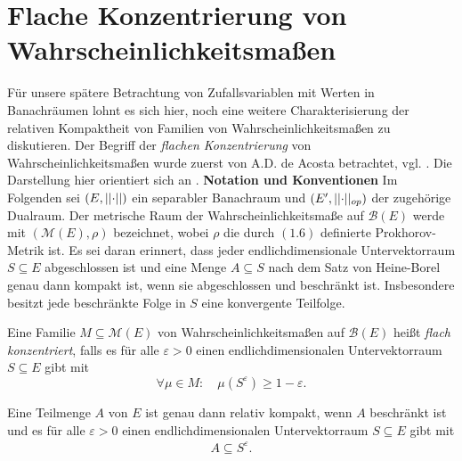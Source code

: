 \section{Flache Konzentrierung von Wahrscheinlichkeitsmaßen}
Für unsere spätere Betrachtung von Zufallsvariablen mit Werten in Banachräumen lohnt es sich hier, noch eine weitere Charakterisierung der relativen Kompaktheit von Familien von Wahrscheinlichkeitsmaßen zu diskutieren. 
Der Begriff der \textit{flachen Konzentrierung} von Wahrscheinlichkeitsmaßen wurde zuerst von A.D. de Acosta betrachtet, vgl. \cite{acosta}. 
Die Darstellung hier orientiert sich an \cite{vakhania}. 
\newline \textbf{Notation und Konventionen} \newline 
Im Folgenden sei $(E, \lvert\lvert \cdot \rvert\rvert)$ ein separabler Banachraum und $(E', \lvert\lvert \cdot \rvert\rvert_{op})$ der zugehörige Dualraum. Der metrische Raum der Wahrscheinlichkeitsmaße auf $\mathcal{B}(E)$ werde mit $(\mathcal{M}(E), \rho)$ bezeichnet, wobei 
$\rho$ die durch $(1.6)$ definierte Prokhorov-Metrik ist. 
Es sei daran erinnert, dass jeder endlichdimensionale Untervektorraum  $S \subseteq E$ abgeschlossen ist und eine Menge $A \subseteq S$ nach dem Satz von Heine-Borel genau dann kompakt ist, wenn sie abgeschlossen und beschränkt ist. 
Insbesondere besitzt jede beschränkte Folge in $S$ eine konvergente Teilfolge. 
\begin{mydef}
    Eine Familie $M \subseteq \mathcal{M}(E)$ von Wahrscheinlichkeitsmaßen auf $\mathcal{B}(E)$ heißt \textit{flach konzentriert}, falls es für alle $\varepsilon > 0$ einen endlichdimensionalen 
    Untervektorraum $S \subseteq E$ gibt mit 
    $$
        \forall \mu \in M: \quad \mu(S^{\varepsilon}) \geq 1 - \varepsilon.
    $$ 
\end{mydef}

\begin{lemma}
    Eine Teilmenge $A$ von $E$ ist genau dann relativ kompakt, wenn $A$ beschränkt ist und es für alle $\varepsilon > 0$ einen endlichdimensionalen Untervektorraum $S \subseteq E$ gibt mit 
    \begin{align*}
        A \subseteq S^{\varepsilon}. 
    \end{align*}
\end{lemma}

